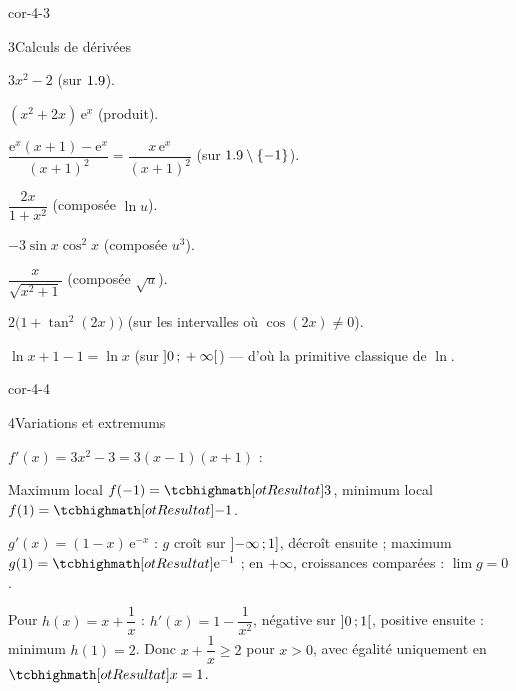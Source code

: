 \begin{blocLivre}{cor-4-3}
\begin{corrige}{3}{Calculs de dérivées}
\begin{questions}
  \item $3x^{2}-2$ (sur $1.9$).
  \item $(x^{2}+2x)\,\mathrm{e}^{x}$ (produit).
  \item $\dfrac{\mathrm{e}^{x}(x+1)-\mathrm{e}^{x}}{(x+1)^{2}}=\dfrac{x\,\mathrm{e}^{x}}{(x+1)^{2}}$
    (sur $1.9\setminus\left\{-1\right\}$).
  \item $\dfrac{2x}{1+x^{2}}$ (composée $\ln u$).
  \item $-3\sin x\cos^{2}x$ (composée $u^{3}$).
  \item $\dfrac{x}{\sqrt{x^{2}+1}}$ (composée $\sqrt{u}$).
  \item $2\bigl(1+\tan^{2}(2x)\bigr)$ (sur les intervalles où $\cos(2x)\neq0$).
  \item $\ln x+1-1=\ln x$ (sur $\mathopen{]}0\,{;}\,+\infty\mathclose{[}$) — d'où la primitive
    classique de $\ln$.
\end{questions}
\end{corrige}
\end{blocLivre}

\begin{blocLivre}{cor-4-4}
\begin{corrige}{4}{Variations et extremums}
\begin{questions}
  \item $f'(x)=3x^{2}-3=3(x-1)(x+1)$ :
\begin{center}
\begin{tableau}
\end{tableau}
\end{center}
    Maximum local $f(-1)=\res{3}$, minimum local $f(1)=\res{-1}$.
  \item $g'(x)=(1-x)\,\mathrm{e}^{-x}$ : $g$ croît sur $\mathopen{]}-\infty\,{;}\,1\mathclose{]}$,
    décroît ensuite ; maximum $g(1)=\res{\mathrm{e}^{-1}}$ ; en $+\infty$,
    croissances comparées : $\lim g=0$.
  \item Pour $h(x)=x+\dfrac1x$ : $h'(x)=1-\dfrac{1}{x^{2}}$, négative sur
    $\mathopen{]}0\,{;}\,1\mathclose{[}$, positive ensuite : minimum $h(1)=2$. Donc
    $x+\dfrac1x\geq2$ pour $x>0$, avec égalité uniquement en $\res{x=1}$.
\end{questions}
\end{corrige}
\end{blocLivre}

